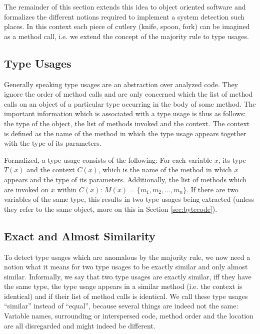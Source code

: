 The remainder of this section extends this idea to object oriented software and formalizes the different notions required to implement a system detection such places.
In this context each piece of cutlery (knife, spoon, fork) can be imagined as a method call, i.e. we extend the concept of the majority rule to type usages.

\subsection{Type Usages}

Generally speaking type usages are an abstraction over analyzed code.
They ignore the order of method calls and are only concerned which the list of method calls on an object of a particular type occurring in the body of some method.
The important information which is associated with a type usage is thus as follows: the type of the object, the list of methods invoked and the context.
The context is defined as the name of the method in which the type usage appears together with the type of its parameters.


Formalized, a type usage consists of the following:
For each variable $x$, its type $T(x)$ and the context $C(x)$, which is the name of the method in which $x$ appears and the type of its parameters.
Additionally, the list of methods which are invoked on $x$ within $C(x)$: $M(x) =\{ m_1, m_2, \dotsc, m_n\}$.
If there are two variables of the same type, this results in two type usages being extracted (unless they refer to the same object, more on this in Section \ref{sec:bytecode}).


\subsection{Exact and Almost Similarity}

To detect type usages which are anomalous by the majority rule, we now need a notion what it means for two type usages to be exactly similar and only almost similar.
Informally, we say that two type usages are exactly similar, iff they have the same type, the type usage appears in a similar method (i.e. the context is identical) and if their list of method calls is identical.
We call these type usages ``similar'' instead of ``equal'', because several things are indeed not the same: Variable names, surrounding or interspersed code, method order and the location are all disregarded and might indeed be different.

